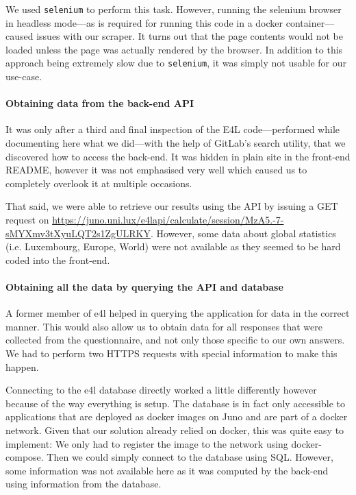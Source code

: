 We used \verb|selenium| to perform this task. However, running the
selenium browser in headless mode---as is required for running this
code in a docker container---caused issues with our scraper. It turns
out that the page contents would not be loaded unless the page was
actually rendered by the browser. In addition to this approach being
extremely slow due to \verb|selenium|, it was simply not usable for
our use-case.

\paragraph{Obtaining data from the back-end API}

It was only after a third and final inspection of the E4L
code---performed while documenting here what we did---with the help of
GitLab's search utility, that we discovered how to access the
back-end.  It was hidden in plain site in the front-end README,
however it was not emphasised very well which caused us to completely
overlook it at multiple occasions.

That said, we were able to retrieve our results using the API by
issuing a GET request on
\url{https://juno.uni.lux/e4lapi/calculate/session/MzA5.-7-sMYXmv3tXyuLQT2s1ZgULRKY}.
However, some data about global statistics (i.e. Luxembourg, Europe,
World) were not available as they seemed to be hard coded into the
front-end.

\paragraph{Obtaining all the data by querying the API and database}

A former member of \gls{e4l} helped in querying the application for
data in the correct manner. This would also allow us to obtain data
for all responses that were collected from the questionnaire, and not
only those specific to our own answers. We had to perform two HTTPS
requests with special information to make this happen.

Connecting to the \gls{e4l} database directly worked a little
differently however because of the way everything is setup. The
database is in fact only accessible to applications that are deployed
as docker images on Juno and are part of a docker network. Given that
our solution already relied on docker, this was quite easy to
implement: We only had to register the image to the network using
docker-compose. Then we could simply connect to the database using
SQL. However, some information was not available here as it was
computed by the back-end using information from the database.

